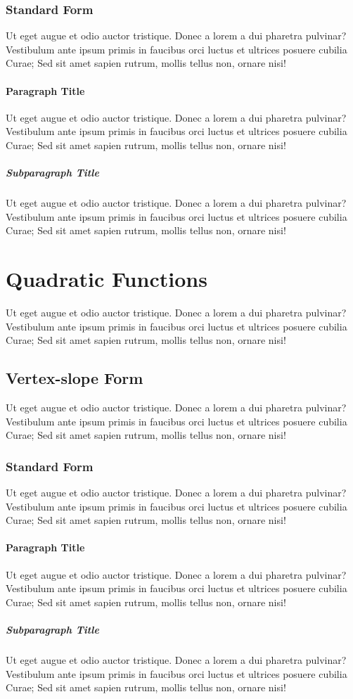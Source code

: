 \documentclass[12pt]{article}
\begin{document}
    \subsubsection{Standard Form}
    Ut eget augue et odio auctor tristique. Donec a lorem a dui pharetra pulvinar?
    Vestibulum ante ipsum primis in faucibus orci luctus et ultrices posuere
    cubilia Curae; Sed sit amet sapien rutrum, mollis tellus non, ornare nisi!
       \paragraph{Paragraph Title}
       Ut eget augue et odio auctor tristique. Donec a lorem a dui pharetra
       pulvinar?  Vestibulum ante ipsum primis in faucibus orci luctus et ultrices
       posuere cubilia Curae; Sed sit amet sapien rutrum, mollis tellus non,
       ornare nisi!
         \subparagraph{Subparagraph Title}
         Ut eget augue et odio auctor tristique. Donec a lorem a dui pharetra
         pulvinar?  Vestibulum ante ipsum primis in faucibus orci luctus et ultrices
         posuere cubilia Curae; Sed sit amet sapien rutrum, mollis tellus non,
         ornare nisi!
\section{Quadratic Functions}
Ut eget augue et odio auctor tristique. Donec a lorem a dui pharetra pulvinar?
Vestibulum ante ipsum primis in faucibus orci luctus et ultrices posuere cubilia
Curae; Sed sit amet sapien rutrum, mollis tellus non, ornare nisi!
  \subsection{Vertex-slope Form}
  Ut eget augue et odio auctor tristique. Donec a lorem a dui pharetra pulvinar?
  Vestibulum ante ipsum primis in faucibus orci luctus et ultrices posuere
  cubilia Curae; Sed sit amet sapien rutrum, mollis tellus non, ornare nisi!
    \subsubsection{Standard Form}
    Ut eget augue et odio auctor tristique. Donec a lorem a dui pharetra pulvinar?
    Vestibulum ante ipsum primis in faucibus orci luctus et ultrices posuere
    cubilia Curae; Sed sit amet sapien rutrum, mollis tellus non, ornare nisi!
       \paragraph{Paragraph Title}
       Ut eget augue et odio auctor tristique. Donec a lorem a dui pharetra
       pulvinar?  Vestibulum ante ipsum primis in faucibus orci luctus et ultrices
       posuere cubilia Curae; Sed sit amet sapien rutrum, mollis tellus non,
       ornare nisi!
         \subparagraph{Subparagraph Title}
         Ut eget augue et odio auctor tristique. Donec a lorem a dui pharetra
         pulvinar?  Vestibulum ante ipsum primis in faucibus orci luctus et ultrices
         posuere cubilia Curae; Sed sit amet sapien rutrum, mollis tellus non,
         ornare nisi!
\end{document}
